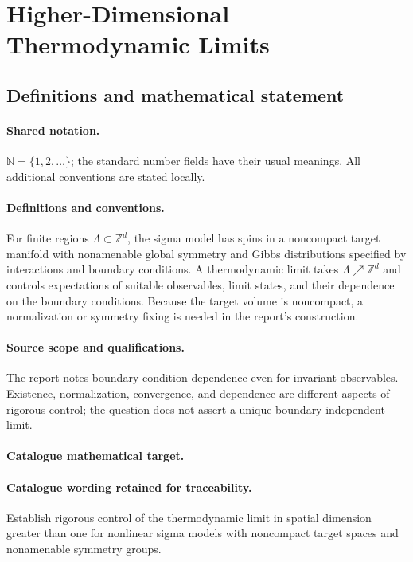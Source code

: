 \documentclass[11pt]{article}
\begin{document}
\section{Higher-Dimensional Thermodynamic Limits}\label{statement}

\subsection{Definitions and mathematical statement}

\paragraph{Shared notation.}$\mathbb N=\{1,2,\ldots\}$; the standard number fields have their usual meanings. All additional conventions are stated locally.


\paragraph{Definitions and conventions.} For finite regions $\Lambda\subset\mathbb Z^d$, the sigma model has spins in a noncompact target manifold with nonamenable global symmetry and Gibbs distributions specified by interactions and boundary conditions. A thermodynamic limit takes $\Lambda\nearrow\mathbb Z^d$ and controls expectations of suitable observables, limit states, and their dependence on the boundary conditions. Because the target volume is noncompact, a normalization or symmetry fixing is needed in the report's construction.

\paragraph{Source scope and qualifications.} The report notes boundary-condition dependence even for invariant observables. Existence, normalization, convergence, and dependence are different aspects of rigorous control; the question does not assert a unique boundary-independent limit.

\paragraph{Catalogue mathematical target.}
\paragraph{Catalogue wording retained for traceability.}
Establish rigorous control of the thermodynamic limit in spatial dimension greater than one for nonlinear sigma models with noncompact target spaces and nonamenable symmetry groups.
\end{document}
